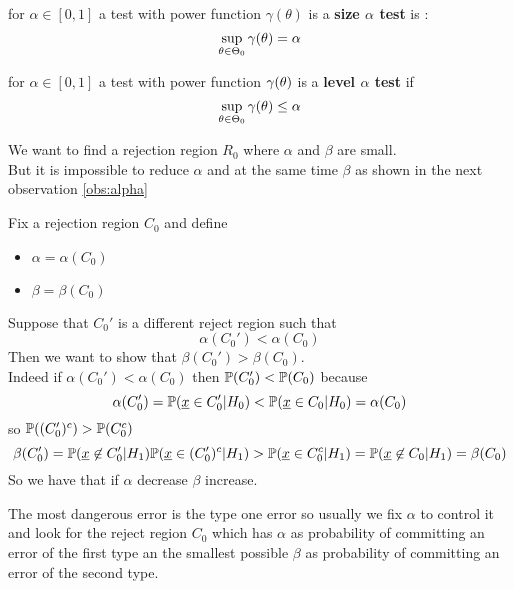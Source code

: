 \begin{defi}for $\alpha\in [0,1]$ a test with power function $\gamma (\theta)$ is a \textbf{size $\alpha$ test} is :
	$$\sup_{\theta \in \Theta_0}\gamma (\theta)=\alpha$$
\end{defi}
\begin{defi}
	for $\alpha \in [0,1]$ a test with power function $\gamma(\theta)$ is a \textbf{level $\alpha$ test} if 
	$$\sup_{\theta \in \Theta_0}\gamma(\theta)\leq \alpha$$
\end{defi}
We want to find a rejection region $R_0$ where $\alpha$ and $\beta$ are small.\\
But it is impossible to reduce $\alpha$ and at the same time $\beta$ as shown in the next observation \ref{obs:alpha}
\begin{oss}\label{obs:alpha}
	Fix a rejection region $C_0$  and define 
	\begin{itemize}
		\item$\alpha=\alpha(C_0)$
		\item$\beta=\beta(C_0)$
	\end{itemize}
Suppose that $C_0'$ is a different reject  region such that
$$\alpha(C_0')<\alpha(C_0)$$
Then we want to show that $\beta(C_0')>\beta(C_0)$.\\
Indeed if $\alpha(C_0')<\alpha(C_0)$ then $\mathbb{P}(C_0')<\mathbb{P}(C_0)$ because 
$$\alpha (C_0')=\mathbb{P}(\underline x \in C_0'|H_0)< \mathbb{P}(\underline x \in C_0|H_0)=\alpha(C_0)$$
so $\mathbb{P}((C_0')^c)>\mathbb{P}(C_0^c)$
$$\beta (C_0')=\mathbb{P}(\underline x \not \in C_0'|H_1)\mathbb{P}(\underline x \in (C_0')^c|H_1 )> \mathbb{P}(\underline x \in C_0^c|H_1)= \mathbb{P}(\underline x \not \in C_0|H_1)=\beta(C_0)$$
So we have that if $\alpha$ decrease $\beta$ increase.
\end{oss}
The most dangerous error is the type one error so usually we fix $\alpha$ to control it and look for the reject region $C_0$ which has $\alpha$ as probability of committing an error of the first type an the smallest possible $\beta$ as probability of committing an error of the second type.\\
